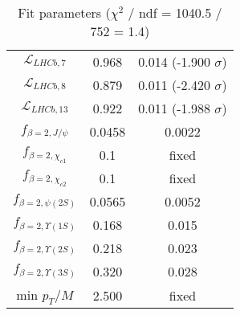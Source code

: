 \begin{table}[h!]
\begin{tabular}{c|c|c}
$\mathcal L_{LHCb,7}$ & 0.968 & 0.014 (-1.900 $\sigma$) \\
$\mathcal L_{LHCb,8}$ & 0.879 & 0.011 (-2.420 $\sigma$) \\
$\mathcal L_{LHCb,13}$ & 0.922 & 0.011 (-1.988 $\sigma$) \\
$f_{\beta=2,J/\psi}$ & 0.0458 & 0.0022 \\
$f_{\beta=2,\chi_{c1}}$ & 0.1 & fixed \\
$f_{\beta=2,\chi_{c2}}$ & 0.1 & fixed \\
$f_{\beta=2,\psi(2S)}$ & 0.0565 & 0.0052 \\
$f_{\beta=2,\Upsilon(1S)}$ & 0.168 & 0.015 \\
$f_{\beta=2,\Upsilon(2S)}$ & 0.218 & 0.023 \\
$f_{\beta=2,\Upsilon(3S)}$ & 0.320 & 0.028 \\
min $p_T/M$ & 2.500 & fixed \\
\end{tabular}
\caption{Fit parameters ($\chi^2$ / ndf = 1040.5 / 752 = 1.4)}
\end{table}
